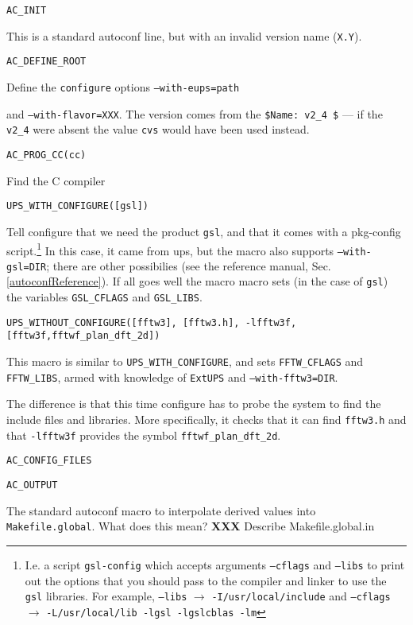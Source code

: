 \documentclass{article}
\newcommand{\XXX}[1]{\textbf{XXX} #1}
\newcommand{\code}[1]{\texttt{#1}}
\newcommand{\file}[1]{\texttt{#1}}
\newcommand{\eups}{\code{ExtUPS}}
\begin{document}
\begin{itemize}
  \item{\code{AC\_INIT}

    This is a standard autoconf line, but with an invalid version name (\code{X.Y}).

  \item{\code{AC\_DEFINE\_ROOT}}

    Define the \code{configure} options \code{--with-eups=path}} and \code{--with-flavor=XXX}.
    The version comes from the \code{\${Name}: v2\_4 \$} --- if the \code{v2\_4} were
    absent the value \code{cvs} would have been used instead.

  \item\code{AC\_PROG\_CC(cc)}

    Find the C compiler    

  \item\code{UPS\_WITH\_CONFIGURE([gsl])}

    Tell configure that we need the product \code{gsl}, and that it
    comes with a pkg-config script.\footnote{%
      I.e. a script \code{gsl-config} which accepts arguments \code{--cflags}
      and \code{--libs} to print out the options that you should pass to the
      compiler and linker to use the \code{gsl} libraries. For example,
      \code{--libs} $\rightarrow$ \code{-I/usr/local/include} and
      \code{--cflags} $\rightarrow$ \code{-L/usr/local/lib -lgsl -lgslcblas -lm}
      }
    In this case, it came from ups,
    but the macro also supports \code{--with-gsl=DIR}; there are
    other possibilies (see the reference manual,
    Sec. \ref{autoconfReference}).  If all goes well the macro macro sets (in the
    case of \code{gsl}) the variables \code{GSL\_CFLAGS} and \code{GSL\_LIBS}.

  \item\code{UPS\_WITHOUT\_CONFIGURE([fftw3], [fftw3.h], -lfftw3f, [fftw3f,fftwf\_plan\_dft\_2d])}

    This macro is similar to \code{UPS\_WITH\_CONFIGURE}, and sets
    \code{FFTW\_CFLAGS} and \code{FFTW\_LIBS}, armed with knowledge of
    \eups{} and  \code{--with-fftw3=DIR}.

    The difference is that this time configure has to probe the system
    to find the include files and libraries.  More specifically, it
    checks that it can find \code{fftw3.h} and that \code{-lfftw3f} provides the symbol
    \code{fftwf\_plan\_dft\_2d}.
    
  \item\code{AC\_CONFIG\_FILES}
  \item\code{AC\_OUTPUT}

    The standard autoconf macro to interpolate derived values
    into \file{Makefile.global}.  What does this mean?
    \XXX{Describe Makefile.global.in}
\end{itemize}
\end{document}
